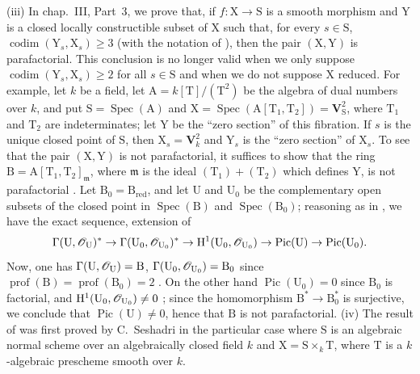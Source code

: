 \begin{env}[21.14.4]
(iii) In chap.~III, Part~3, we prove that, if $f:\mathrm{X}\to\mathrm{S}$ is a smooth morphism and $\mathrm{Y}$ is a closed locally constructible subset of $\mathrm{X}$ such that, for every $s\in\mathrm{S}$, $\operatorname{codim}(\mathrm{Y}_s,\mathrm{X}_s)\geq3$ (with the notation of ), then the pair $(\mathrm{X},\mathrm{Y})$ is parafactorial.
This conclusion is no longer valid when we only suppose $\operatorname{codim}(\mathrm{Y}_s,\mathrm{X}_s)\geq 2$ for all $s\in\mathrm{S}$ and when we do not suppose $\mathrm{X}$ reduced.
For example, let $k$ be a field, let $\mathrm{A}=k[\mathrm{T}]/(\mathrm{T}^2)$ be the algebra of dual numbers over $k$, and put $\mathrm{S}=\operatorname{Spec}(\mathrm{A})$ and $\mathrm{X}=\operatorname{Spec}(\mathrm{A}[\mathrm{T}_1,\mathrm{T}_2])=\mathbf{V}_{\mathrm{S}}^2$, where $\mathrm{T}_1$ and $\mathrm{T}_2$ are indeterminates; let $\mathrm{Y}$ be the ``zero section'' of this fibration. If $s$ is the unique closed point of $\mathrm{S}$, then $\mathrm{X}_s=\mathbf{V}_k^2$ and $\mathrm{Y}_s$ is the ``zero section'' of $\mathrm{X}_s$.
To see that the pair $(\mathrm{X},\mathrm{Y})$ is not parafactorial, it suffices to show that the ring $\mathrm{B}=\mathrm{A}[\mathrm{T}_1,\mathrm{T}_2]_\mathfrak{m}$, where $\mathfrak{m}$ is the ideal $(\mathrm{T}_1)+(\mathrm{T}_2)$ which defines $\mathrm{Y}$, is not parafactorial .
Let $\mathrm{B}_0=\mathrm{B}_{\mathrm{red}}$, and let $\mathrm{U}$ and $\mathrm{U}_0$ be the complementary open subsets of the closed point in $\operatorname{Spec}(\mathrm{B})$ and $\operatorname{Spec}(\mathrm{B}_0)$; reasoning as in , we have the exact sequence, extension of 
\[
  \Gamma(\mathrm{U},\mathscr{O}_{\mathrm{U}})^*\to\Gamma(\mathrm{U}_0,\mathscr{O}_{\mathrm{U}_0})^*\to\mathrm{H}^1(\mathrm{U}_0,\mathscr{O}_{\mathrm{U}_0})\to\operatorname{Pic}(\mathrm{U})\to\operatorname{Pic}(\mathrm{U}_0).
\]
Now, one has $\Gamma(\mathrm{U},\mathscr{O}_{\mathrm{U}})=\mathrm{B}$, $\Gamma(\mathrm{U}_0,\mathscr{O}_{\mathrm{U}_0})=\mathrm{B}_0$ since $\operatorname{prof}(\mathrm{B})=\operatorname{prof}(\mathrm{B}_0)=2$ .
On the other hand $\operatorname{Pic}(\mathrm{U}_0)=0$ since $\mathrm{B}_0$ is factorial, and $\mathrm{H}^1(\mathrm{U}_0,\mathscr{O}_{\mathrm{U}_0})\neq 0$ \cite[3, Example~III-1]{IV-41}; since the homomorphism $\mathrm{B}^*\to\mathrm{B}_0^*$ is surjective, we conclude that $\operatorname{Pic}(\mathrm{U})\neq 0$, hence that $\mathrm{B}$ is not parafactorial.
(iv) The result of  was first proved by C.~Seshadri \cite{IV-44} in the particular case where $\mathrm{S}$ is an algebraic normal scheme over an algebraically closed field $k$ and $\mathrm{X}=\mathrm{S}\times_k\mathrm{T}$, where $\mathrm{T}$ is a $k$-algebraic prescheme smooth over $k$.

\end{env}
